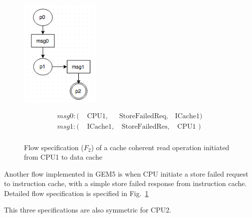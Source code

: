 \documentclass[conference]{IEEEtran}
\begin{document}
\begin{figure} 
 \centerline{
 \includegraphics[width=1.5in]{figures/storeFail.png}}
 
 {\footnotesize
 \[
 \begin{array}{llll}
 msg0: (&\mbox{ CPU1},&\mbox{StoreFailedReq},&\mbox{ICache1})\\                   
 msg1: (&\mbox{ ICache1},&\mbox{ StoreFailedRes},&\mbox{ CPU1 })\\
 \end{array}
 \]}
 \caption{Flow specification ($F_2$) of a cache coherent read operation initiated from CPU1 to  data cache}
 \label{storefail}
 
 \end{figure}
Another flow implemented in GEM5 is when CPU initiate a store failed request to instruction cache, with a simple store failed response from instruction cache. Detailed flow specification is specified in Fig.~\ref{storefail}

This three specifications are also symmetric for CPU2.
\end{document}
